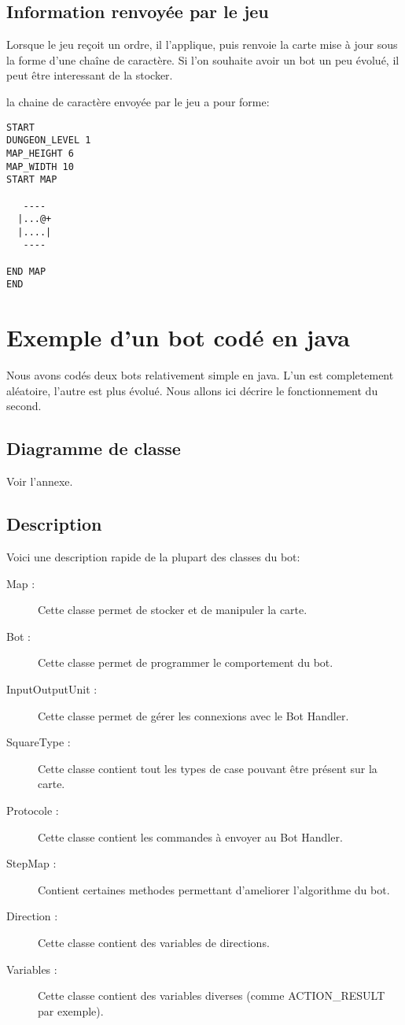 \subsection{Information renvoyée par le jeu}
Lorsque le jeu reçoit un ordre, il l'applique, puis renvoie la carte mise à jour sous la forme d'une chaîne de caractère. Si l'on souhaite avoir un bot un peu évolué, il peut être interessant de la stocker. 

la chaine de caractère envoyée par le jeu a pour forme:

\begin{verbatim}
START
DUNGEON_LEVEL 1
MAP_HEIGHT 6
MAP_WIDTH 10
START MAP
          
   ----   
  |...@+  
  |....|  
   ----   
          
END MAP
END
\end{verbatim}



\section{Exemple d'un bot codé en java}

Nous avons codés deux bots relativement simple en java. L'un est completement aléatoire, l'autre est plus évolué. Nous allons ici décrire le fonctionnement du second.

\subsection{Diagramme de classe}

Voir l'annexe.
 
\subsection{Description}

Voici une description rapide de la plupart des classes du bot:

\begin{description}
\item[Map :] Cette classe permet de stocker et de manipuler la carte.
\item[Bot :] Cette classe permet de programmer le comportement du bot.
\item[InputOutputUnit :] Cette classe permet de gérer les connexions avec le Bot Handler.
\item[SquareType :] Cette classe contient tout les types de case pouvant être présent sur la carte.
\item[Protocole :] Cette classe contient les commandes à envoyer au Bot Handler.
\item[StepMap :] Contient certaines methodes permettant d'ameliorer l'algorithme du bot.
\item[Direction :] Cette classe contient des variables de directions.
\item[Variables :] Cette classe contient des variables diverses (comme ACTION\_RESULT par exemple).
\end{description} 

